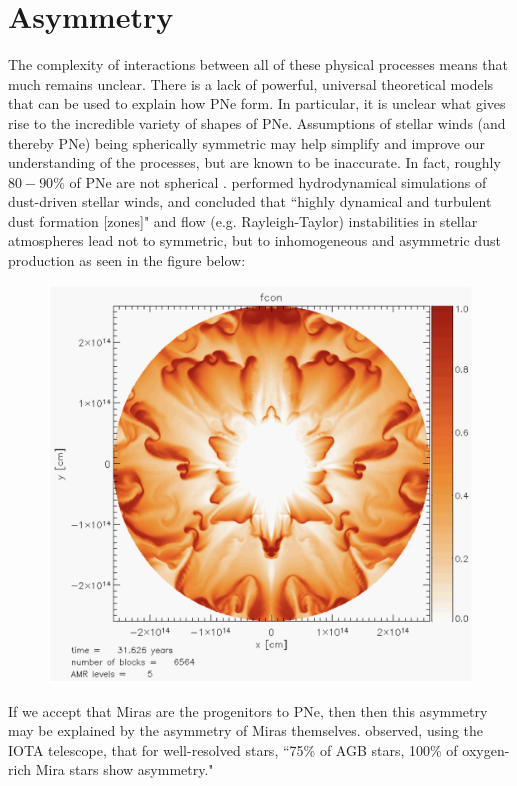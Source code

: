 \documentclass[twocolumn]{aastex63}
\begin{document}
\section{Asymmetry}\label{sec:asymmetry}

The complexity of interactions between all of these physical processes means that much remains unclear. There is a lack of powerful, universal theoretical models that can be used to explain how PNe form. In particular, it is unclear what gives rise to the incredible variety of shapes of PNe. Assumptions of stellar winds (and thereby PNe) being spherically symmetric may help simplify and improve our understanding of the processes, but are known to be inaccurate. In fact, roughly $80-90\%$ of PNe are not spherical \citep{demarco, soker1997}. \cite{woitke} performed hydrodynamical simulations of dust-driven stellar winds, and concluded that ``highly dynamical and turbulent dust formation [zones]" and flow (e.g. Rayleigh-Taylor) instabilities in stellar atmospheres lead not to symmetric, but to inhomogeneous and asymmetric dust production as seen in the figure below:

\begin{figure}[ht]
    \includegraphics[width=\textwidth]{dust_condensation.png}
\end{figure}

If we accept that Miras are the progenitors to PNe, then then this asymmetry may be explained by the asymmetry of Miras themselves. \cite{ragland} observed, using the IOTA telescope, that for well-resolved stars, ``75\% of AGB stars, 100\% of oxygen-rich Mira stars show asymmetry." 
\end{document}
